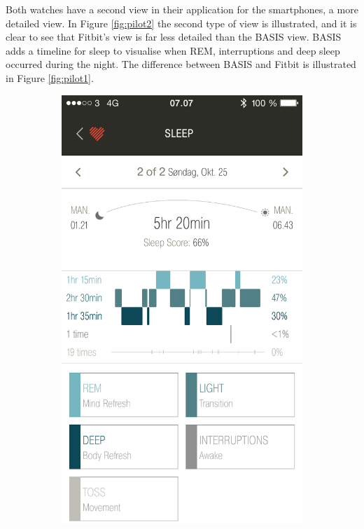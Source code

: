 \documentclass[12pt]{article} %
\begin{document}
Both watches have a second view in their application for the smartphones, a more detailed view. In Figure \ref{fig:pilot2} the second type of view is illustrated, and it is clear to see that Fitbit's view is far less detailed than the BASIS view. BASIS adds a timeline for sleep to visualise when REM, interruptions and deep sleep occurred during the night. The difference between BASIS and Fitbit is illustrated in Figure \ref{fig:pilot1}.

\begin{figure}[H]
    \centering
    \begin{subfigure}[b]{0.45\textwidth}
        \includegraphics[width=\textwidth]{26-10-basis}

\end{subfigure}
\end{figure}
\end{document}
